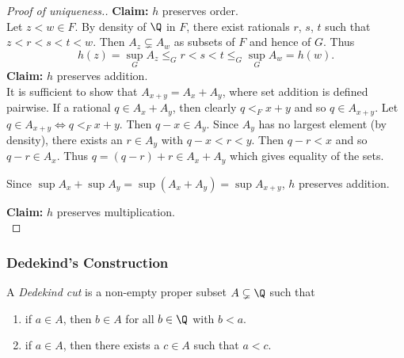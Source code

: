 \begin{proof}[Proof of uniqueness.]
    \textbf{Claim:} $h$ preserves order. \\
    Let $z < w \in F$.
    By density of $\Q$ in $F$, there exist rationals $r$, $s$, $t$ such that
    $z < r < s < t < w$.
    Then $A_z \subsetneq A_w$ as subsets of $F$ and hence of $G$.
    Thus \[
        h(z) = \sup_G A_z \le_G r < s < t \le_G \sup_G A_w = h(w).
    \]
    \textbf{Claim:} $h$ preserves addition. \\
    It is sufficient to show that $A_{x+y} = A_x + A_y$, where set addition
    is defined pairwise.
    If a rational $q \in A_x + A_y$, then clearly $q <_F x + y$ and so
    $q \in A_{x+y}$.
    Let $q \in A_{x+y} \iff q <_F x + y$.
    Then $q - x \in A_y$.
    Since $A_y$ has no largest element (by density), there exists an
    $r \in A_y$ with $q - x < r < y$.
    Then $q - r < x$ and so $q - r \in A_x$.
    Thus $q = (q - r) + r \in A_x + A_y$ which gives equality of the sets.

    Since $\sup A_x + \sup A_y = \sup (A_x + A_y) = \sup A_{x+y}$, $h$
    preserves addition.

    \textbf{Claim:} $h$ preserves multiplication. \\

\end{proof}

\subsubsection{Dedekind's Construction} \label{sec:R:dedekind}
\begin{definition} \label{def:R:dedekind:cut}
    A \emph{Dedekind cut} is a non-empty proper subset $A \subsetneq \Q$
    such that
    \begin{enumerate}
        \item if $a \in A$, then $b \in A$ for all $b \in \Q$ with $b < a$.
        \item if $a \in A$, then there exists a $c \in A$ such that $a < c$.
    \end{enumerate}
\end{definition}

